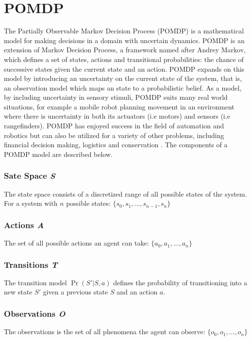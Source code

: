 \documentclass[12pt,openany,a4paper]{book}
\begin{document}
\section{POMDP}
The Partially Observable Markov Decision Process (POMDP) is a mathematical model for making decisions in a domain with uncertain dynamics. POMDP is an extension of Markov Decision Process, a framework named after Andrey Markov, which defines a set of states, actions and transitional probabilities: the chance of successive states given the current state and an action. POMDP expands on this model by introducing an uncertainty on the current state of the system, that is, an observation model which maps an state to a probabilistic belief.
As a model, by including uncertainty in sensory stimuli, POMDP suits many real world situations, for example a mobile robot planning movement in an environment where there is uncertainty in both its actuators (i.e motors) and sensors (i.e rangefinders).
 POMDP has enjoyed success in the field of automation and robotics but can also be utilized for a variety of other problems, including financial decision making, logistics and conservation  \cite{pomdptigers}.
The components of a POMDP model are described below.

\subsubsection*{Sate Space \emph{S}}
\noindent The state space consists of a discretized range of all possible states of the system. 
\\
For a system with \ensuremath{n} possible states: 
\ensuremath{ \{ s_{0}, s_{1}, ... ,s_{n-1}, s_{n} \} } 

\subsubsection*{Actions \emph{A}}
\noindent The set of all possible actions an agent can take:
\ensuremath{ \{ a_{0},a_{1}, ... ,a_{n} \} } 


\subsubsection*{Transitions \emph{T}}
\noindent The transition model \ensuremath{\Pr(S' | S,a)} defines the probability of transitioning into a new state \ensuremath{S'} given a previous state \ensuremath{S} and an action \ensuremath{a}.

\subsubsection*{Observations \emph{O}}
\noindent The observations is the set of all phenomena the agent can observe:
\ensuremath{ \{ o_{0},o_{1}, ... ,o_{n} \} } 
\end{document}
